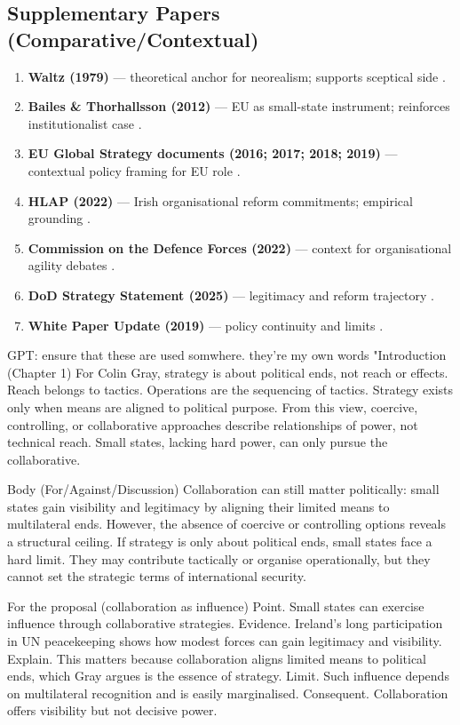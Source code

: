 \subsection*{Supplementary Papers (Comparative/Contextual)}
\begin{enumerate}
	\item \textbf{Waltz (1979)} — theoretical anchor for neorealism; supports sceptical side \parencite{WALTZ_1979}.
	\item \textbf{Bailes \& Thorhallsson (2012)} — EU as small-state instrument; reinforces institutionalist case \parencite{BAILES_2012}.
	\item \textbf{EU Global Strategy documents (2016; 2017; 2018; 2019)} — contextual policy framing for EU role \parencite{EU_2016,EU_2017,EU_2018,EU_2019}.
	\item \textbf{HLAP (2022)} — Irish organisational reform commitments; empirical grounding \parencite{HLAP_2022}.
	\item \textbf{Commission on the Defence Forces (2022)} — context for organisational agility debates \parencite{CODF_2022}.
	\item \textbf{DoD Strategy Statement (2025)} — legitimacy and reform trajectory \parencite{DOD_2025}.
	\item \textbf{White Paper Update (2019)} — policy continuity and limits \parencite{WHITE_2015}.
\end{enumerate}


GPT: ensure that these are used somwhere. they're my own words "Introduction (Chapter 1)
For Colin Gray, strategy is about political ends, not reach or effects. Reach belongs to tactics. Operations are the sequencing of tactics. Strategy exists only when means are aligned to political purpose. From this view, coercive, controlling, or collaborative approaches describe relationships of power, not technical reach. Small states, lacking hard power, can only pursue the collaborative.

Body (For/Against/Discussion)
Collaboration can still matter politically: small states gain visibility and legitimacy by aligning their limited means to multilateral ends. However, the absence of coercive or controlling options reveals a structural ceiling. If strategy is only about political ends, small states face a hard limit. They may contribute tactically or organise operationally, but they cannot set the strategic terms of international security.

For the proposal (collaboration as influence)
Point. Small states can exercise influence through collaborative strategies.
Evidence. Ireland’s long participation in UN peacekeeping shows how modest forces can gain legitimacy and visibility.
Explain. This matters because collaboration aligns limited means to political ends, which Gray argues is the essence of strategy.
Limit. Such influence depends on multilateral recognition and is easily marginalised.
Consequent. Collaboration offers visibility but not decisive power.

